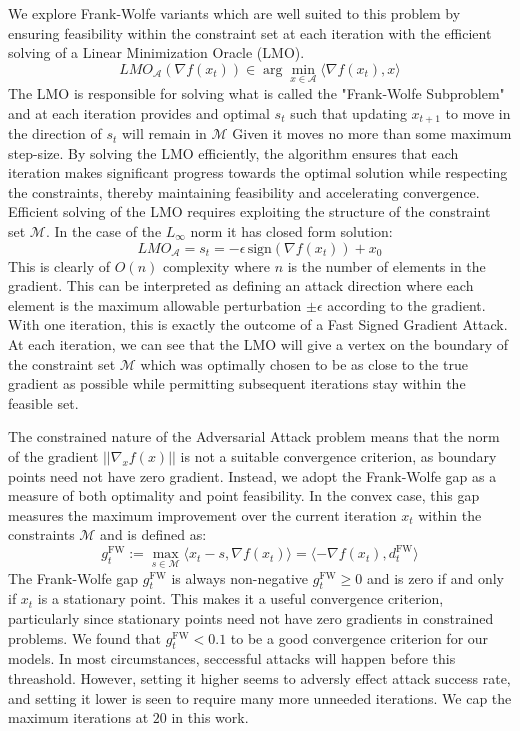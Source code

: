 \documentclass{article}
\begin{document}
We explore Frank-Wolfe variants which are well suited to this problem by ensuring feasibility within the constraint set at each iteration with the efficient solving of a Linear Minimization Oracle (LMO). 
$$
LMO_\mathcal{A}(\nabla f(x_t)) \in \arg \min_{x \in \mathcal{A}} \langle \nabla f(x_t), x\rangle
$$
The LMO is responsible for solving what is called the "Frank-Wolfe Subproblem" and at each iteration provides and optimal $s_t$ such that updating $x_{t+1}$ to move in the direction of $s_t$ will remain in $\mathcal{M}$ Given it moves no more than some maximum step-size. By solving the LMO efficiently, the algorithm ensures that each iteration makes significant progress towards the optimal solution while respecting the constraints, thereby maintaining feasibility and accelerating convergence. 
Efficient solving of the LMO requires exploiting the structure of the constraint set $\mathcal{M}$. In the case of the $L_\infty$ norm it has closed form solution:
$$LMO_\mathcal{A} = s_t = -\epsilon \, \text{sign}(\nabla f(x_t)) + x_0$$
This is clearly of $O(n)$ complexity where $n$ is the number of elements in the gradient. This can be interpreted as defining an attack direction where each element is the maximum allowable perturbation $\pm \epsilon$ according to the gradient. With one iteration, this is exactly the outcome of a Fast Signed Gradient Attack. At each iteration, we can see that the LMO will give a vertex on the boundary of the constraint set $\mathcal{M}$ which was optimally chosen to be as close to the true gradient as possible while permitting subsequent iterations stay within the feasible set.


The constrained nature of the Adversarial Attack problem means that the norm of the gradient $||\nabla_x f(x)||$ is not a suitable convergence criterion, as boundary points need not have zero gradient. Instead, we adopt the Frank-Wolfe gap as a measure of both optimality and point feasibility. In the convex case, this gap measures the maximum improvement over the current iteration $x_t$ within the constraints $\mathcal{M}$ and is defined as:
$$g_t^{\text{FW}} := \max_{s \in \mathcal{M}} \langle x_t - s, \nabla f(x_t) \rangle = \langle -\nabla f(x_t), d_t^{\text{FW}} \rangle$$
The Frank-Wolfe gap $g_t^{\text{FW}}$ is always non-negative $g_t^{\text{FW}} \geq 0$ and is zero if and only if $x_t$ is a stationary point. This makes it a useful convergence criterion, particularly since stationary points need not have zero gradients in constrained problems. We found that $g_t^\text{FW} < 0.1$ to be a good convergence criterion for our models. In most circumstances, seccessful attacks will happen before this threashold. However, setting it higher seems to adversly effect attack success rate, and setting it lower is seen to require many more unneeded iterations. We cap the maximum iterations at $20$ in this work.
\end{document}
